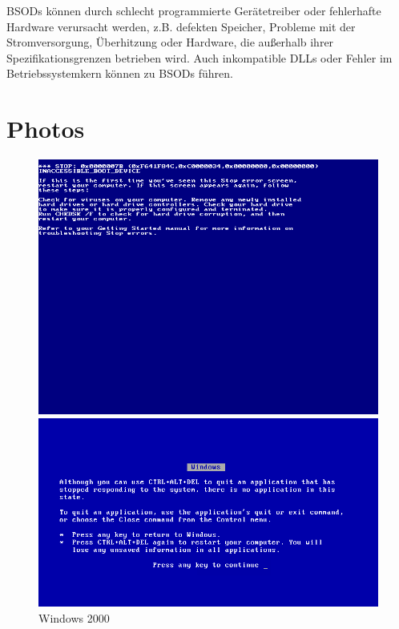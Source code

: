 \documentclass[paper=a4,fontsize=12pt,ngerman,parskip=half]{scrartcl}
\begin{document}
BSODs können durch schlecht programmierte Gerätetreiber oder fehlerhafte Hardware verursacht werden, z.B. defekten Speicher, Probleme mit der Stromversorgung, Überhitzung oder Hardware, die außerhalb ihrer Spezifikationsgrenzen betrieben wird. Auch inkompatible DLLs oder Fehler im Betriebssystemkern können zu BSODs führen.\cite{avast}

\section*{Photos}
\begin{figure}[!ht]
  \centering
  \begin{minipage}[b]{0.4\textwidth}
    \centering
    \includegraphics[width=\textwidth]{graphics/Pic/029-bsod_Windows_2000.png}
    \caption{Windows 2000}
    \label{fig:image1}
  \end{minipage}
  \hfill
  \begin{minipage}[b]{0.4\textwidth}
    \centering
    \includegraphics[width=\textwidth]{graphics/Pic/Windows_3.1_BSoD_(fixed).png}

\end{minipage}
\end{figure}
\end{document}
